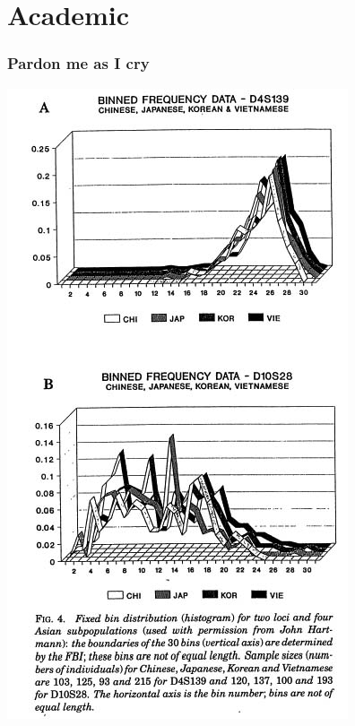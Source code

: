 \documentclass{beamer}
\begin{document}
\section{Academic}
\begin{frame}
  \frametitle{Pardon me as I cry}
  \begin{center}
    \includegraphics[height = 0.8\textheight, keepaspectratio = true]{figure/roeder_fig4}
  \end{center}
\end{frame}
\end{document}
